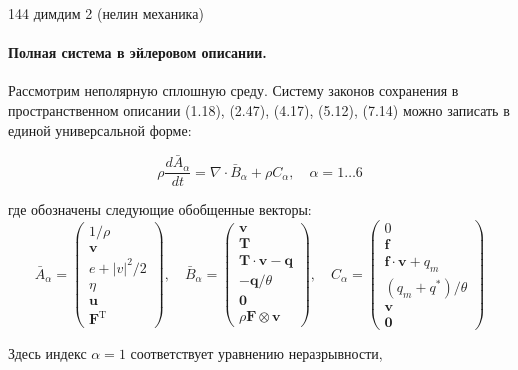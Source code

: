 
144 димдим 2 (нелин механика)



\paragraph{ Полная система в эйлеровом описании.}
Рассмотрим неполярную сплошную среду. Систему законов сохранения в пространственном описании (1.18), (2.47), (4.17), (5.12), (7.14) можно записать в единой универсальной форме:

\begin{equation}
\rho \frac{d \bar{A}_{\alpha}}{d t}=\nabla \cdot \bar{B}_{\alpha}+\rho C_{\alpha}, \quad \alpha=1 \ldots 6 \label{eq:91}
\end{equation}

где обозначены следующие обобщенные векторы:
\begin{equation}
\label{eq:92}
\bar{A}_{\alpha}=\left(\begin{array}{c}
1 / \rho  \\
\mathbf{v} \\
e+|v|^{2} / 2 \\
\eta \\
\mathbf{u} \\
\mathbf{F}^{\mathrm{T}}
\end{array}\right), \quad \bar{B}_{\alpha}=\left(\begin{array}{c}
\mathbf{v} \\
\mathbf{T} \\
\mathbf{T} \cdot \mathbf{v}-\mathbf{q} \\
-\mathbf{q} / \theta \\
\mathbf{0} \\
\rho \mathbf{F} \otimes \mathbf{v}
\end{array}\right), \quad C_{\alpha}=\left(\begin{array}{c}
0 \\
\mathbf{f} \\
\mathbf{f} \cdot \mathbf{v}+q_{m} \\
\left(q_{m}+q^{*}\right) / \theta \\
\mathbf{v} \\
\mathbf{0}
\end{array}\right)
\end{equation}


Здесь индекс $\alpha=1$ соответствует уравнению неразрывности,

